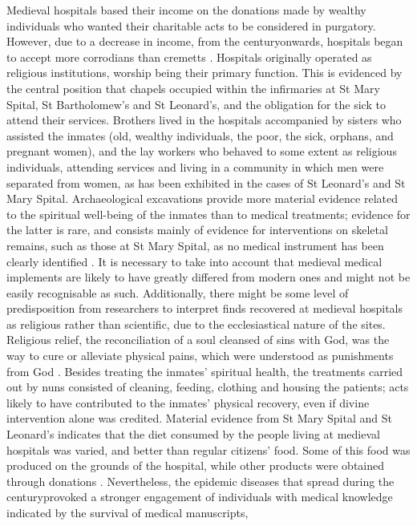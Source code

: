 \documentclass[%
	]{ijsra}
\begin{document}
Medieval hospitals based their income on the donations made by wealthy individuals who wanted their charitable acts to be considered in purgatory. However, due to a decrease in income, from the  century\AD onwards, hospitals began to accept more corrodians than cremetts \parencites[69]{Dean_2008}[207]{Malcom_2014}. 
Hospitals originally operated as religious institutions, worship being their primary function. This is evidenced by the central position that chapels occupied within the infirmaries at St Mary Spital, St Bartholomew’s and St Leonard’s, and the obligation for the sick to attend their services. Brothers lived in the hospitals accompanied by sisters who assisted the inmates (old, wealthy individuals, the poor, the sick, orphans, and pregnant women), and the lay workers who behaved to some extent as religious individuals, attending services and living in a community in which men were separated from women, as has been exhibited in the cases of St Leonard’s and St Mary Spital. 
Archaeological excavations provide more material evidence related to the spiritual well-being of the inmates than to medical treatments; evidence for the latter is rare, and consists mainly of evidence for interventions on skeletal remains, such as those at St Mary Spital, as no medical instrument has been clearly identified \parencite[65,76]{Bowers_2007}. 
It is necessary to take into account that medieval medical implements are likely to have greatly differed from modern ones and might not be easily recognisable as such. Additionally, there might be some level of predisposition from researchers to interpret finds recovered at medieval hospitals as religious rather than scientific, due to the ecclesiastical nature of the sites. 
Religious relief, the reconciliation of a soul cleansed of sins with God, was the way to cure or alleviate physical pains, which were understood as punishments from God \parencites[12-13,96]{Biller_2001}[42-43]{Rawcliffe_1995}. 
Besides treating the inmates’ spiritual health, the treatments carried out by nuns consisted of cleaning, feeding, clothing and housing the patients; acts likely to have contributed to the inmates’ physical recovery, even if divine intervention alone was credited. Material evidence from St Mary Spital and St Leonard’s indicates that the diet consumed by the people living at medieval hospitals was varied, and better than regular citizens’ food. Some of this food was produced on the grounds of the hospital, while other products were obtained through donations \parencites[76]{Egan_2007}[208]{Malcom_2014}.
Nevertheless, the epidemic diseases that spread during the  century\AD provoked a stronger engagement of individuals with medical knowledge indicated by the survival of medical manuscripts, 
\end{document}
